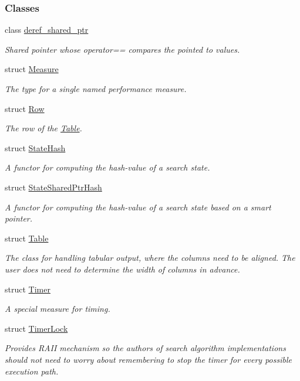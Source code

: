 \subsubsection*{Classes}
\begin{DoxyCompactItemize}
\item 
class \hyperlink{classslb_1_1core_1_1util_1_1deref__shared__ptr}{deref\+\_\+shared\+\_\+ptr}
\begin{DoxyCompactList}\small\item\em Shared pointer whose {\ttfamily operator==} compares the pointed to values. \end{DoxyCompactList}\item 
struct \hyperlink{structslb_1_1core_1_1util_1_1Measure}{Measure}
\begin{DoxyCompactList}\small\item\em The type for a single named performance measure. \end{DoxyCompactList}\item 
struct \hyperlink{structslb_1_1core_1_1util_1_1Row}{Row}
\begin{DoxyCompactList}\small\item\em The row of the \hyperlink{structslb_1_1core_1_1util_1_1Table}{Table}. \end{DoxyCompactList}\item 
struct \hyperlink{structslb_1_1core_1_1util_1_1StateHash}{State\+Hash}
\begin{DoxyCompactList}\small\item\em A functor for computing the hash-\/value of a search state. \end{DoxyCompactList}\item 
struct \hyperlink{structslb_1_1core_1_1util_1_1StateSharedPtrHash}{State\+Shared\+Ptr\+Hash}
\begin{DoxyCompactList}\small\item\em A functor for computing the hash-\/value of a search state based on a smart pointer. \end{DoxyCompactList}\item 
struct \hyperlink{structslb_1_1core_1_1util_1_1Table}{Table}
\begin{DoxyCompactList}\small\item\em The class for handling tabular output, where the columns need to be aligned. The user does not need to determine the width of columns in advance. \end{DoxyCompactList}\item 
struct \hyperlink{structslb_1_1core_1_1util_1_1Timer}{Timer}
\begin{DoxyCompactList}\small\item\em A special measure for timing. \end{DoxyCompactList}\item 
struct \hyperlink{structslb_1_1core_1_1util_1_1TimerLock}{Timer\+Lock}
\begin{DoxyCompactList}\small\item\em Provides R\+A\+II mechanism so the authors of search algorithm implementations should not need to worry about remembering to stop the timer for every possible execution path. \end{DoxyCompactList}\end{DoxyCompactItemize}
